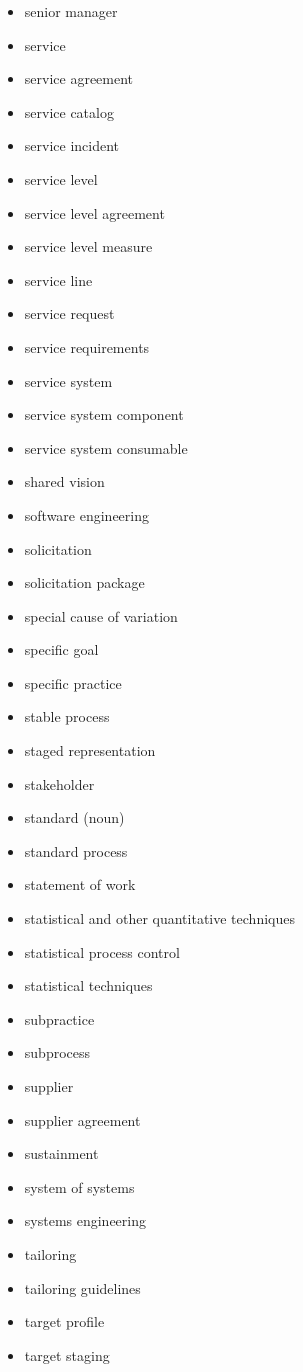 \begin{itemize}
\item senior manager
\item service
\item service agreement
\item service catalog
\item service incident
\item service level
\item service level agreement
\item service level measure
\item service line
\item service request
\item service requirements
\item service system
\item service system component
\item service system consumable
\item shared vision
\item software engineering
\item solicitation
\item solicitation package
\item special cause of variation
\item specific goal
\item specific practice
\item stable process
\item staged representation
\item stakeholder
\item standard (noun)
\item standard process
\item statement of work
\item statistical and other quantitative techniques
\item statistical process control
\item statistical techniques
\item subpractice
\item subprocess
\item supplier
\item supplier agreement
\item sustainment
\item system of systems
\item systems engineering
\item tailoring
\item tailoring guidelines
\item target profile
\item target staging

\end{itemize}
